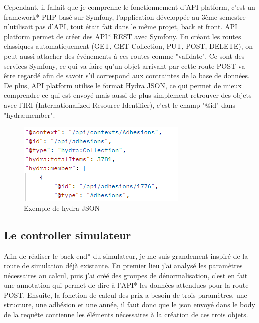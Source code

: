 \documentclass[a4paper,12pt]{report}
\begin{document}
Cependant, il fallait que je comprenne le fonctionnement d'API platform, c'est un framework* PHP basé sur Symfony, l'application développée au 3ème semestre n'utilisait pas d'API, tout était fait dans le même projet, back et front. API platform permet de créer des API* REST avec Symfony. En créant les routes classiques automatiquement (GET, GET Collection, PUT, POST, DELETE), on peut aussi attacher des événements à ces routes comme "validate". Ce sont des services Symfony, ce qui va faire qu'un objet arrivant par cette route POST va être regardé afin de savoir s'il correspond aux contraintes de la base de données. De plus, API platform utilise le format Hydra JSON, ce qui permet de mieux comprendre ce qui est envoyé mais aussi de plus simplement retrouver des objets avec l'IRI (Internationalized Resource Identifier), c'est le champ "@id" dans "hydra:member".

\begin{figure}[ht]
    \centering
    \includegraphics[scale=0.8]{hydraJSON.png}
    \caption{Exemple de hydra JSON}
    \label{fig:hyda-json}
\end{figure}

\subsection{Le controller simulateur}
Afin de réaliser le back-end* du simulateur, je me suis grandement inspiré de la route de simulation déjà existante. En premier lieu j'ai analysé les paramètres nécessaires au calcul, puis j'ai créé des groupes de dénormalisation, c'est en fait une annotation qui permet de dire à l'API* les données attendues pour la route POST. Ensuite, la fonction de calcul des prix a besoin de trois paramètres, une structure, une adhésion et une année, il faut donc que le json envoyé dans le body de la requête contienne les éléments nécessaires à la création de ces trois objets.
\end{document}
